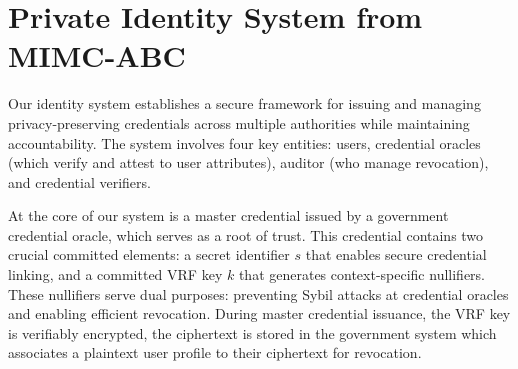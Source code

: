 




\cleardoublepage
\section{Private Identity System from MIMC-ABC}\label{sec:idsys}

Our identity system establishes a secure framework for issuing and managing privacy-preserving credentials across multiple authorities while maintaining accountability. The system involves four key entities: users, credential oracles (which verify and attest to user attributes), auditor (who manage revocation), and credential verifiers.

\noindent At the core of our system is a master credential issued by a government credential oracle, which serves as a root of trust. This credential contains two crucial committed elements: a secret identifier $s$ that enables secure credential linking, and a committed VRF key $k$ that generates context-specific nullifiers. These nullifiers serve dual purposes: preventing Sybil attacks at credential oracles and enabling efficient revocation. During master credential issuance, the VRF key is verifiably encrypted, the ciphertext is stored in the government system which associates a plaintext user profile to their ciphertext for revocation.


